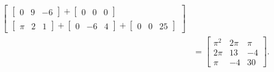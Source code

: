 \documentclass[12pt,a4paper]{article}
\begin{document}
\begin{enumerate}
\begin{enumerate}
\begin{align*}
\begin{bmatrix}
\begin{bmatrix}
0 & 9 & -6
\end{bmatrix}
+
\begin{bmatrix}
 0 & 0 & 0
\end{bmatrix}
\\
\begin{bmatrix}
\pi & 2 & 1
\end{bmatrix}
+
\begin{bmatrix}
0 & -6 & 4
\end{bmatrix}
+
\begin{bmatrix}
0 & 0 & 25
\end{bmatrix}
\end{bmatrix} \\
& =
\begin{bmatrix}
\pi^2 & 2\pi & \pi \\
2\pi & 13 & -4 \\
\pi & -4 & 30 
\end{bmatrix}.
\end{align*}


\end{enumerate}
\end{enumerate}
\end{document}
